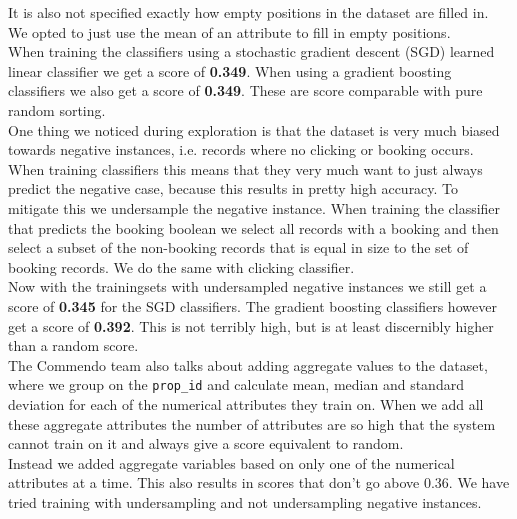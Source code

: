 \documentclass{llncs}
\begin{document}
It is also not specified exactly how empty positions in the dataset are filled in. We opted to just use the mean of an attribute to fill in empty positions.\\
When training the classifiers using a stochastic gradient descent (SGD) learned linear classifier we get a score of \textbf{0.349}. When using a gradient boosting classifiers we also get a score of \textbf{0.349}. These are score comparable with pure random sorting. \\
One thing we noticed during exploration is that the dataset is very much biased towards negative instances, i.e. records where no clicking or booking occurs. When training classifiers this means that they very much want to just always predict the negative case, because this results in pretty high accuracy. To mitigate this we undersample the negative instance. When training the classifier that predicts the booking boolean we select all records with a booking and then select a subset of the non-booking records that is equal in size to the set of booking records. We do the same with clicking classifier.\\
Now with the trainingsets with undersampled negative instances we still get a score of \textbf{0.345} for the SGD classifiers. The gradient boosting classifiers however get a score of \textbf{0.392}. This is not terribly high, but is at least discernibly higher than a random score.\\
The Commendo team also talks about adding aggregate values to the dataset, where we group on the \verb!prop_id! and  calculate mean, median and standard deviation for each of the numerical attributes they train on. When we add all these aggregate attributes the number of attributes are so high that the system cannot train on it and always give a score equivalent to random.\\
Instead we added aggregate variables based on only one of the numerical attributes at a time. This also results in scores that don't go above 0.36. We have tried training with undersampling and not undersampling negative instances.
\end{document}
